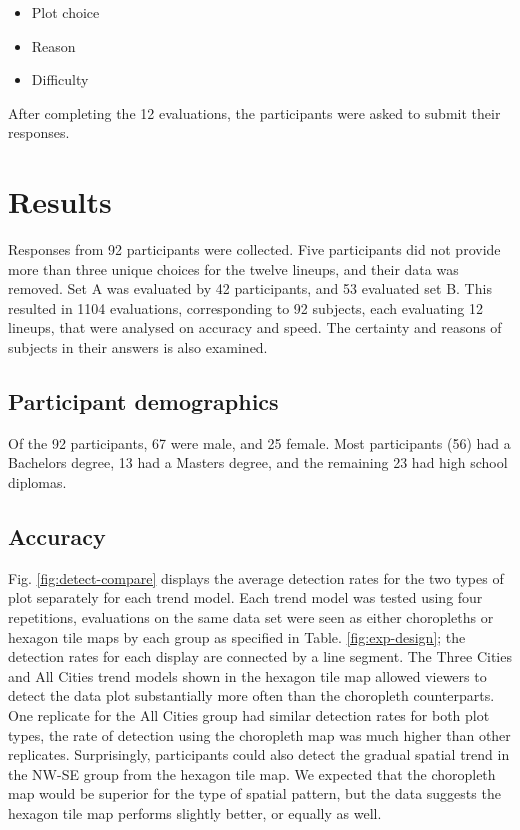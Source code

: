 \documentclass[
]{article}
\providecommand{\tightlist}{%
  \setlength{\itemsep}{0pt}\setlength{\parskip}{0pt}}
\begin{document}
\begin{itemize}
\tightlist
\item
  Plot choice
\item
  Reason
\item
  Difficulty
\end{itemize}

After completing the 12 evaluations, the participants were asked to
submit their responses.

\section{Results}\label{results}

Responses from 92 participants were collected. Five participants did not
provide more than three unique choices for the twelve lineups, and their
data was removed. Set A was evaluated by 42 participants, and 53
evaluated set B. This resulted in 1104 evaluations, corresponding to 92
subjects, each evaluating 12 lineups, that were analysed on accuracy and
speed. The certainty and reasons of subjects in their answers is also
examined.

\subsection{Participant demographics}\label{participant-demographics}

Of the 92 participants, 67 were male, and 25 female. Most participants
(56) had a Bachelors degree, 13 had a Masters degree, and the remaining
23 had high school diplomas.

\subsection{Accuracy}\label{accuracy}

Fig. \ref{fig:detect-compare} displays the average detection rates for
the two types of plot separately for each trend model. Each trend model
was tested using four repetitions, evaluations on the same data set were
seen as either choropleths or hexagon tile maps by each group as
specified in Table. \ref{fig:exp-design}; the detection rates for each
display are connected by a line segment. The Three Cities and All Cities
trend models shown in the hexagon tile map allowed viewers to detect the
data plot substantially more often than the choropleth counterparts. One
replicate for the All Cities group had similar detection rates for both
plot types, the rate of detection using the choropleth map was much
higher than other replicates. Surprisingly, participants could also
detect the gradual spatial trend in the NW-SE group from the hexagon
tile map. We expected that the choropleth map would be superior for the
type of spatial pattern, but the data suggests the hexagon tile map
performs slightly better, or equally as well.
\end{document}
